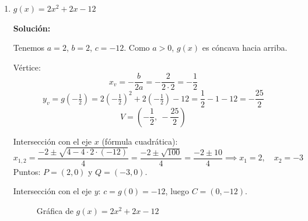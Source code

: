 \documentclass[12pt]{article}
\begin{document}
\begin{enumerate}[label=\alph*.-]
    \begin{enumerate}[label=\roman*.]
        \item $D_f = \mathbb{R}$ \quad e \quad $I_f = \left[-\dfrac{25}{4},\ +\infty\right)$
        \item $f(x)$ es \textbf{decreciente} en $\left(-\infty,\ \dfrac{5}{2}\right)$ y \textbf{creciente} en $\left(\dfrac{5}{2},\ +\infty\right)$.
    \end{enumerate}
 
    \item $g(x) = 2x^2 + 2x - 12$
    
    \textbf{Solución:}
    
    Tenemos $a = 2$, $b = 2$, $c = -12$. Como $a > 0$, $g(x)$ es cóncava hacia arriba.
 
    Vértice:
    \[
    x_v = -\frac{b}{2a} = -\frac{2}{2 \cdot 2} = -\frac{1}{2}
    \]
    \[
    y_v = g\!\left(-\tfrac{1}{2}\right) = 2\!\left(-\tfrac{1}{2}\right)^2 + 2\!\left(-\tfrac{1}{2}\right) - 12 = \frac{1}{2} - 1 - 12 = -\frac{25}{2}
    \]
    \[
    V = \left(-\frac{1}{2},\ -\frac{25}{2}\right)
    \]
 
    Intersección con el eje $x$ (fórmula cuadrática):
    \[
    x_{1,2} = \frac{-2 \pm \sqrt{4 - 4 \cdot 2 \cdot (-12)}}{4} = \frac{-2 \pm \sqrt{100}}{4} = \frac{-2 \pm 10}{4}
    \implies x_1 = 2,\quad x_2 = -3
    \]
    Puntos: $P = (2, 0)$ y $Q = (-3, 0)$.
 
    Intersección con el eje $y$: $c = g(0) = -12$, luego $C = (0, -12)$.
 
    \begin{figure}[H]
        \centering
        \caption{Gráfica de $g(x) = 2x^2 + 2x - 12$}
    \end{figure}
 

\end{enumerate}
\end{document}
